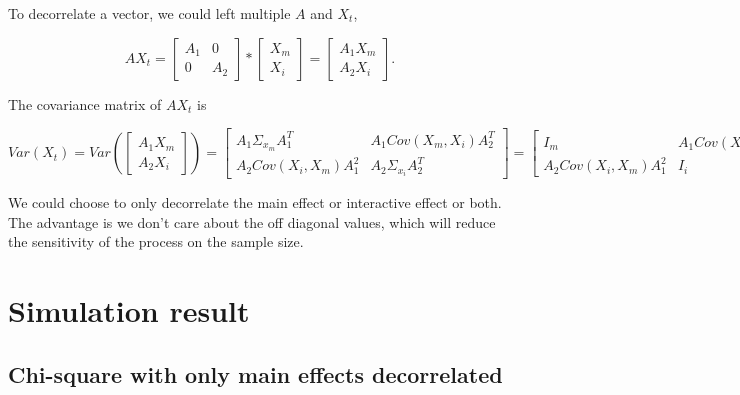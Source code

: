 \documentclass[]{article}
\begin{document}
To decorrelate a vector, we could left multiple \(A\) and \(X_t\),

\[
  AX_t = \begin{bmatrix}
           A_1 & 0 \\
           0 & A_2 
          \end{bmatrix} * \begin{bmatrix}
                            X_m \\
                            X_i
                          \end{bmatrix} = \begin{bmatrix}
                                            A_1X_m \\
                                            A_2X_i
                                          \end{bmatrix}.
\]

The covariance matrix of \(AX_t\) is

\[
  Var(X_t) = Var\left(\begin{bmatrix}
              A_1X_m \\
              A_2X_i
            \end{bmatrix}\right) = \begin{bmatrix}
                                     A_1\Sigma_{x_m}A_1^T & A_1Cov(X_m, X_i)A_2^T \\
                                     A_2Cov(X_i, X_m)A_1^2 & A_2\Sigma_{x_i}A_2^T 
                                    \end{bmatrix} = \begin{bmatrix}
                                                     I_m & A_1Cov(X_m, X_i)A_2^T \\
                                                     A_2Cov(X_i, X_m)A_1^2 & I_i
                                                    \end{bmatrix}.
\]

We could choose to only decorrelate the main effect or interactive
effect or both. The advantage is we don't care about the off diagonal
values, which will reduce the sensitivity of the process on the sample
size.

\section{Simulation result}\label{simulation-result}

\subsection{Chi-square with only main effects
decorrelated}\label{chi-square-with-only-main-effects-decorrelated}
\end{document}
